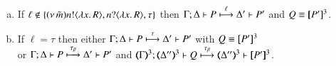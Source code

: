 \begin{proposition}
\begin{enumerate}
\begin{enumerate}[a)]
				\item	If $\ell \notin \{(\nu\, \tilde{m}) n ! \langle \lambda x.\,R \rangle, n ? \langle \lambda x.\,R \rangle, \tau\}$
					then
					$\Gamma; \Delta \vdash P \stackrel{\ell}{\longmapsto} \Delta' \vdash P'$ and $Q \equiv [\!\![P']\!\!]^3$.

				\item	If $\ell = \tau$ then
					either
					$\Gamma; \Delta \vdash P \stackrel{\tau}{\longmapsto} \Delta' \vdash P'$ with $Q \equiv [\!\![P']\!\!]^3$\\
					or
					$\Gamma; \Delta \vdash P \stackrel{\tau_{\beta}}{\longmapsto} \Delta' \vdash P'$ and
					$\horel{\tmap{\Gamma}{3}}{\tmap{\Delta''}{3}}{Q}{\hby{\btau}}
					{\tmap{\Delta''}{3}}{\pmap{P'}{3}}$.
			\end{enumerate}
	\end{enumerate}
\end{proposition}

